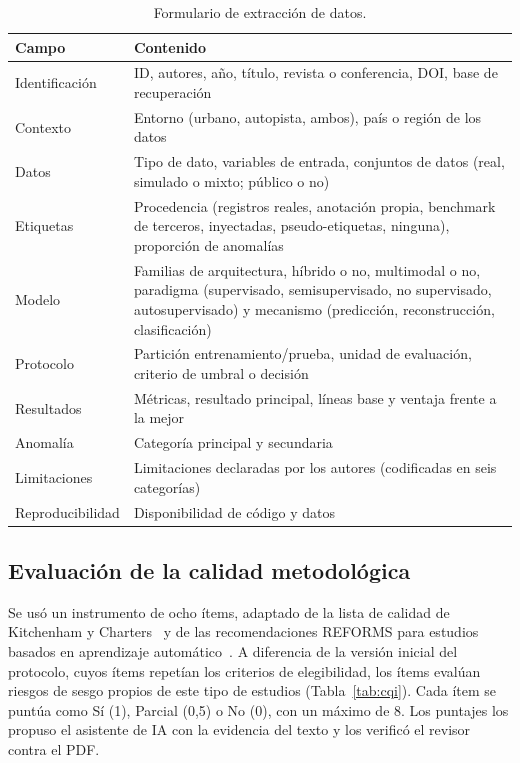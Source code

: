 \documentclass[12pt, a4paper]{article}
\begin{document}
\begin{table}[H]
\centering
\small
\caption{Formulario de extracción de datos.}
\label{tab:formulario}
\begin{tabularx}{\linewidth}{lY}
\toprule
\textbf{Campo} & \textbf{Contenido} \\
\midrule
Identificación & ID, autores, año, título, revista o conferencia, DOI, base de recuperación \\
Contexto & Entorno (urbano, autopista, ambos), país o región de los datos \\
Datos & Tipo de dato, variables de entrada, conjuntos de datos (real, simulado o mixto; público o no) \\
Etiquetas & Procedencia (registros reales, anotación propia, benchmark de terceros, inyectadas, pseudo-etiquetas, ninguna), proporción de anomalías \\
Modelo & Familias de arquitectura, híbrido o no, multimodal o no, paradigma (supervisado, semisupervisado, no supervisado, autosupervisado) y mecanismo (predicción, reconstrucción, clasificación) \\
Protocolo & Partición entrenamiento/prueba, unidad de evaluación, criterio de umbral o decisión \\
Resultados & Métricas, resultado principal, líneas base y ventaja frente a la mejor \\
Anomalía & Categoría principal y secundaria \\
Limitaciones & Limitaciones declaradas por los autores (codificadas en seis categorías) \\
Reproducibilidad & Disponibilidad de código y datos \\
\bottomrule
\end{tabularx}
\end{table}

\subsection{Evaluación de la calidad metodológica}

Se usó un instrumento de ocho ítems, adaptado de la lista de calidad de Kitchenham y Charters~\cite{Kitchenham2007} y de las recomendaciones REFORMS para estudios basados en aprendizaje automático~\cite{kapoor2024reforms}. A diferencia de la versión inicial del protocolo, cuyos ítems repetían los criterios de elegibilidad, los ítems evalúan riesgos de sesgo propios de este tipo de estudios (Tabla~\ref{tab:cqi}). Cada ítem se puntúa como Sí (1), Parcial (0,5) o No (0), con un máximo de 8. Los puntajes los propuso el asistente de IA con la evidencia del texto y los verificó el revisor contra el PDF.
\end{document}
